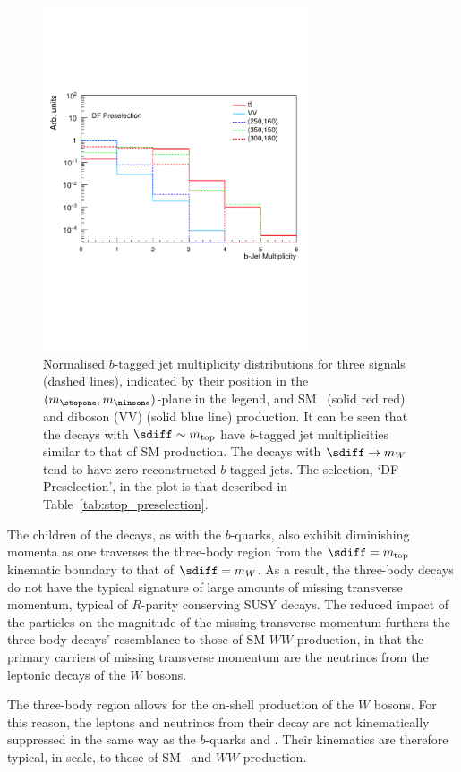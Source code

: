 \begin{figure}[!htb]
    \begin{center}
        \includegraphics[width=0.7\textwidth]{figures/search_stop2l/strategy/comp_plots/dfpresel_nBJets}
        \caption{
            Normalised $b$-tagged jet multiplicity distributions for three \stopone signals (dashed lines),
            indicated by their position in the $(m_{\stopone}, m_{\ninoone})$-plane in the legend,
            and SM \ttbar~(solid red red) and diboson (VV) (solid blue line) production.
            It can be seen that the \stopone decays with $\sdiff \sim m_{\text{top}}$ have $b$-tagged jet
            multiplicities similar to that of SM \ttbar production.
            The \stopone decays with $\sdiff \rightarrow m_W$ tend to have zero reconstructed $b$-tagged jets.
            The selection, `DF Preselection', in the plot is that described in Table~\ref{tab:stop_preselection}.
        }
        \label{fig:stop_nbjets}
    \end{center}
\end{figure}

The \ninoone children of the \stopone decays, as with the $b$-quarks, also exhibit diminishing
momenta as one traverses the three-body region from the $\sdiff = m_{\text{top}}$ kinematic boundary to that of $\sdiff = m_W$.
As a result, the three-body \stopone decays do not have the typical signature of large
amounts of missing transverse momentum, typical of $R$-parity conserving SUSY decays.
The reduced impact of the \ninoone particles on the magnitude of the missing transverse momentum
furthers the three-body \stopone decays' resemblance to those of SM $WW$ production, in that
the primary carriers of missing transverse momentum are the neutrinos from the leptonic decays
of the $W$ bosons.

The three-body region allows for the on-shell production of the $W$ bosons.
For this reason, the leptons and neutrinos from their decay are not kinematically suppressed
in the same way as the $b$-quarks and \ninoone.
Their kinematics are therefore typical, in scale, to those of SM \ttbar~and $WW$ production.
